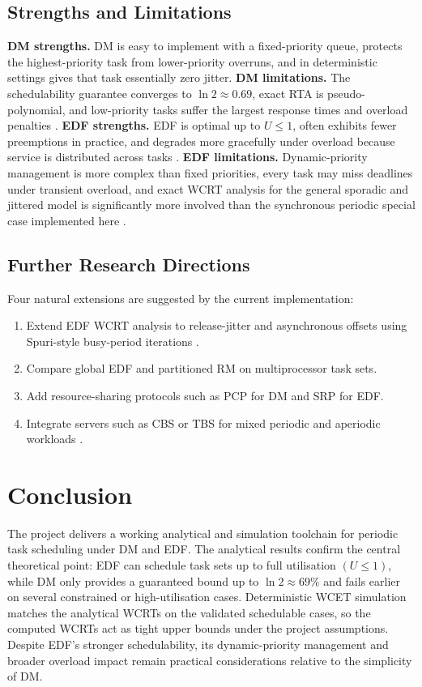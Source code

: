 \documentclass[11pt,a4paper]{article}
\begin{document}
\subsection{Strengths and Limitations}
\textbf{DM strengths.} DM is easy to implement with a fixed-priority queue, protects the highest-priority task from lower-priority overruns, and in deterministic settings gives that task essentially zero jitter.\newline
\textbf{DM limitations.} The schedulability guarantee converges to \(\ln 2 \approx 0.69\), exact RTA is pseudo-polynomial, and low-priority tasks suffer the largest response times and overload penalties \cite{LL73,buttazzo2024}.\newline
\textbf{EDF strengths.} EDF is optimal up to \(U \leq 1\), often exhibits fewer preemptions in practice, and degrades more gracefully under overload because service is distributed across tasks \cite{LL73,Buttazzo2005,Cervin2003}.\newline
\textbf{EDF limitations.} Dynamic-priority management is more complex than fixed priorities, every task may miss deadlines under transient overload, and exact WCRT analysis for the general sporadic and jittered model is significantly more involved than the synchronous periodic special case implemented here \cite{Stankovic1998}.

\subsection{Further Research Directions}
Four natural extensions are suggested by the current implementation:
\begin{enumerate}
  \item Extend EDF WCRT analysis to release-jitter and asynchronous offsets using Spuri-style busy-period iterations \cite{Stankovic1998}.
  \item Compare global EDF and partitioned RM on multiprocessor task sets.
  \item Add resource-sharing protocols such as PCP for DM and SRP for EDF.
  \item Integrate servers such as CBS or TBS for mixed periodic and aperiodic workloads \cite{Abeni1998,Buttazzo2005}.
\end{enumerate}

\section{Conclusion}
The project delivers a working analytical and simulation toolchain for periodic task scheduling under DM and EDF. The analytical results confirm the central theoretical point: EDF can schedule task sets up to full utilisation \((U \leq 1)\), while DM only provides a guaranteed bound up to \(\ln 2 \approx 69\%\) and fails earlier on several constrained or high-utilisation cases. Deterministic WCET simulation matches the analytical WCRTs on the validated schedulable cases, so the computed WCRTs act as tight upper bounds under the project assumptions. Despite EDF's stronger schedulability, its dynamic-priority management and broader overload impact remain practical considerations relative to the simplicity of DM.
\end{document}
